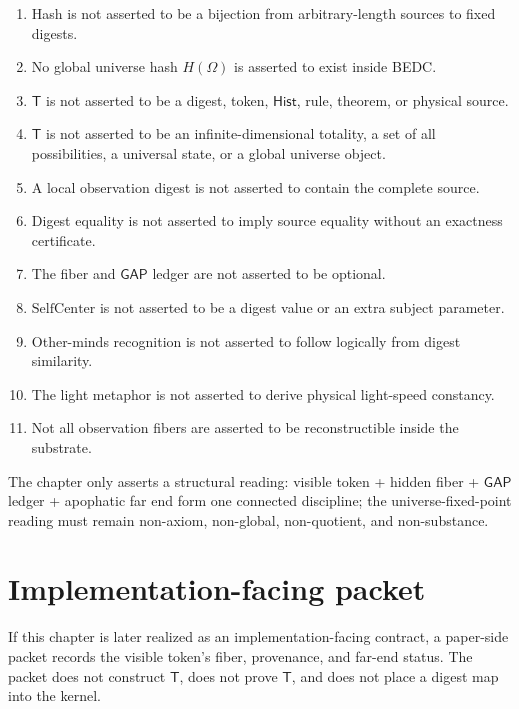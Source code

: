 \begin{enumerate}
\item Hash is not asserted to be a bijection from arbitrary-length sources to fixed digests.
\item No global universe hash $H(\Omega)$ is asserted to exist inside BEDC.
\item $\mathsf{T}$ is not asserted to be a digest, token, $\mathsf{Hist}$, rule, theorem, or physical source.
\item $\mathsf{T}$ is not asserted to be an infinite-dimensional totality, a set of all possibilities, a universal state, or a global universe object.
\item A local observation digest is not asserted to contain the complete source.
\item Digest equality is not asserted to imply source equality without an exactness certificate.
\item The fiber and $\mathsf{GAP}$ ledger are not asserted to be optional.
\item $\mathrm{SelfCenter}$ is not asserted to be a digest value or an extra subject parameter.
\item Other-minds recognition is not asserted to follow logically from digest similarity.
\item The light metaphor is not asserted to derive physical light-speed constancy.
\item Not all observation fibers are asserted to be reconstructible inside the substrate.
\end{enumerate}

The chapter only asserts a structural reading: visible token + hidden fiber + $\mathsf{GAP}$ ledger + apophatic far end form one connected discipline; the universe-fixed-point reading must remain non-axiom, non-global, non-quotient, and non-substance.

\section{Implementation-facing packet}
\label{sec:hash-like-implementation-packet}

If this chapter is later realized as an implementation-facing contract, a paper-side packet records the visible token's fiber, provenance, and far-end status. The packet does not construct $\mathsf{T}$, does not prove $\mathsf{T}$, and does not place a digest map into the kernel.

